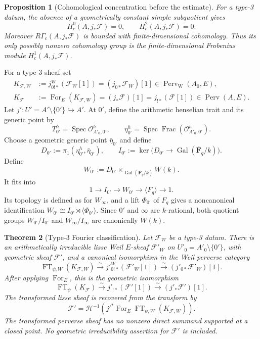 \documentclass[10pt]{article}
\newtheorem{theorem}{Theorem}[section]
\newtheorem{proposition}[theorem]{Proposition}
\theoremstyle{definition}
\newcommand{\Fbar}{\overline{\mathbf F}_q}
\newcommand{\Spec}{\operatorname{Spec}}
\newcommand{\Gal}{\operatorname{Gal}}
\newcommand{\FT}{\operatorname{FT}}
\begin{document}
\begin{proposition}[Cohomological concentration before the estimate]
For a type-3 datum, the absence of a geometrically constant simple
subquotient gives
\[
 H_c^0(A,j_*\mathcal F)=0,
 \qquad H_c^2(A,j_*\mathcal F)=0.
\]
Moreover \(R\Gamma_c(A,j_*\mathcal F)\) is bounded with
finite-dimensional cohomology.  Thus its only possibly nonzero
cohomology group is the finite-dimensional Frobenius module
\(H_c^1(A,j_*\mathcal F)\).
\end{proposition}

For a type-3 sheaf set
\[
 \begin{aligned}
 K_{\mathcal F,W}&:=j^W_{0!*}(\mathcal F_W[1])
              =(j_{0*}\mathcal F_W)[1]
              \in\operatorname{Perv}_{\mathrm W}(A_0,E),\\
 K_{\mathcal F}&:=\operatorname{For}_E(K_{\mathcal F,W})
              =(j_*\mathcal F)[1]
              =j_{!*}(\mathcal F[1])\in\operatorname{Perv}(A,E).
 \end{aligned}
\]
Let \(j':U'=A'\setminus\{0'\}\hookrightarrow A'\).  At \(0'\), define
the arithmetic henselian trait and its generic point by
\[
 T_{0'}^h=\Spec\mathcal O^h_{A'_0,0'},
 \qquad
 \eta_{0'}^h=\Spec\operatorname{Frac}(\mathcal O^h_{A'_0,0'}).
\]
Choose a geometric generic point \(\bar\eta_{0'}\) and define
\[
  D_{0'}:=\pi_1(\eta_{0'}^h,\bar\eta_{0'}),
  \qquad
  I_{0'}:=\ker\bigl(D_{0'}\longrightarrow\Gal(\Fbar/k)\bigr).
\]
Define
\[
 W_{0'}:=D_{0'}\times_{\Gal(\Fbar/k)}W(k).
\]
It fits into
\[
 1\longrightarrow I_{0'}\longrightarrow W_{0'}
   \longrightarrow\langle F_q\rangle\longrightarrow1.
\]
Its topology is defined as for \(W_\infty\), and a lift \(\Phi_{0'}\) of
\(F_q\) gives a noncanonical identification
\(W_{0'}\cong I_{0'}\rtimes\langle\Phi_{0'}\rangle\).  Since \(0'\) and
\(\infty\) are \(k\)-rational, both quotient groups
\(W_{0'}/I_{0'}\) and \(W_\infty/I_\infty\) are canonically \(W(k)\).

\begin{theorem}[Type-3 Fourier classification]
Let \(\mathcal F_W\) be a type-3 datum.  There is an arithmetically
irreducible lisse Weil \(E\)-sheaf \(\mathcal F'_W\) on
\(U'_0=A'_0\setminus\{0'\}\), with geometric sheaf \(\mathcal F'\), and a
canonical isomorphism in the Weil perverse category
\[
  \FT_{\psi,W}(K_{\mathcal F,W})
  \xrightarrow{\sim}j'^W_{0!*}(\mathcal F'_W[1])
  \xrightarrow{\sim}(j'_{0*}\mathcal F'_W)[1].
\]
After applying \(\operatorname{For}_E\), this is the geometric isomorphism
\[
 \FT_\psi(K_{\mathcal F})
  \xrightarrow{\sim}j'_{!*}(\mathcal F'[1])
  \xrightarrow{\sim}(j'_*\mathcal F')[1].
\]
The transformed lisse sheaf is recovered from the transform by
\[
 \mathcal F'
 =\mathcal H^{-1}\!\left(
   j'^*\operatorname{For}_E\FT_{\psi,W}(K_{\mathcal F,W})\right).
\]
The transformed perverse sheaf has no nonzero direct summand supported at a
closed point.  No geometric irreducibility assertion for \(\mathcal F'\) is
included.
\end{theorem}
\end{document}
